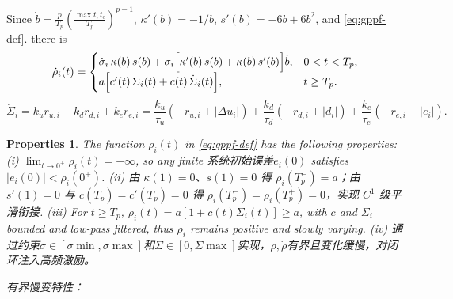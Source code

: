 \documentclass[pdflatex,sn-mathphys-num]{sn-jnl}%
\theoremstyle{thmstyleone}%
\theoremstyle{thmstyletwo}%
\newtheorem{properties}{Properties}%
\theoremstyle{thmstylethree}%
\begin{document}
Since $\dot b=\frac{p}{T_p}(\frac{\max{t,t_\epsilon }}{T_p})^{p-1}$, $\kappa'(b)=-1/b$, $s'(b)=-6b+6b^2$,  and \cref{eq:gppf-def}. there is
\begin{equation}\label{eq:gppf-def}
	\dot{\rho}_i(t)=
	\begin{cases}
   \dot\sigma_i\,\kappa(b)\,s(b) + \sigma_i \Bigl[\kappa'(b)\,s(b)+\kappa(b)\,s'(b)\Bigr]\dot b, &0<t<T_p,\\
a\Bigl[c'(t)\,\Sigma_i(t)+c(t)\,\dot\Sigma_i(t)\Bigr], &t\ge T_p.
\end{cases}
\end{equation}
\begin{equation}
\dot{\Sigma}_{i} = k_{u}\dot{r}_{u,i} + k_{d}\dot{r}_{d,i} + k_{e}\dot{r}_{e,i} 
= \frac{k_{u}}{\tau_{u}}(-r_{u,i} + |\Delta u_{i}|) 
+\frac{k_{d}}{\tau_{d}}(-r_{d,i} + |d_{i}|) 
+\frac{k_{e}}{\tau_{e}}(-r_{e,i} + |e_{i}|). 
\end{equation}


\begin{properties}

The function $\rho_i(t)$ in \eqref{eq:gppf-def} has the following properties:
(\emph{i}) $\displaystyle\lim_{t\to0^+}\rho_i(t)=+\infty$, so any finite 系统初始误差$e_i(0)$ satisfies $|e_i(0)|<\rho_i(0^+)$. (\emph{ii}) 由 $\kappa(1)=0$、$s(1)=0$ 得 $\rho_i(T_p^-)=a$；由 $s'(1)=0$ 与 $c(T_p)=c'(T_p)=0$ 得 $\dot\rho_i(T_p^-)=\dot\rho_i(T_p^+)=0$，实现 $C^1$ 级平滑衔接.
(\emph{iii}) For $t\ge T_p$, $\rho_i(t)=a[1+c(t)\Sigma_i(t)]\ge a$, with $c$ and $\Sigma_i$ bounded and low-pass filtered, thus $\rho_i$ remains positive and slowly varying.
(\emph{iv}) 通过约束$\sigma\in[\sigma{\min},\sigma{\max}]$和$\Sigma\in[0,\Sigma{\max}]$实现，$\rho, \dot{\rho}$有界且变化缓慢，对闭环注入高频激励。

有界慢变特性：
\end{properties} 
\end{document}
